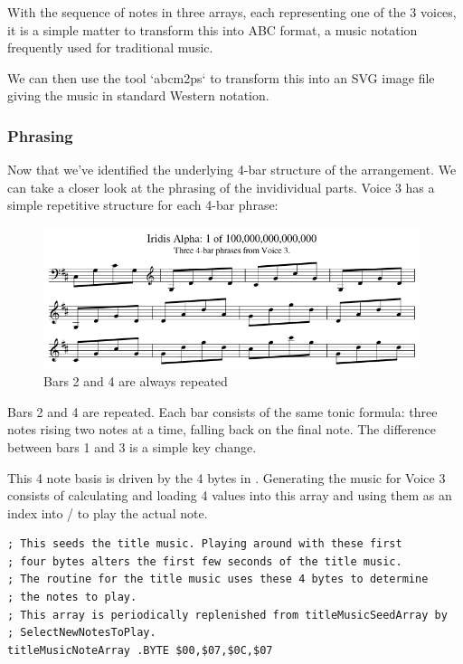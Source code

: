 \begin{tcolorbox}[%
  breakable,
  parbox = false,
  frame hidden,
  sharp corners,
  after skip=10pt,
  overlay broken = {
    \draw[]
      (frame.north west) rectangle (frame.south east);},
]{}
With the sequence of notes in three arrays, each representing one of the 3 voices, it is a simple
matter to transform this into ABC format, a music notation frequently used for traditional music.



We can then use the tool `abcm2ps` to transform this into an SVG image file giving the music in
standard Western notation.

\end{tcolorbox}%

\subsubsection{Phrasing}
Now that we've identified the underlying 4-bar structure of the arrangement. We can take a closer look at the 
phrasing of the invidividual parts. Voice 3 has a simple repetitive structure for each 4-bar phrase:

\begin{figure}[H]
{
  \begin{adjustbox}{width=11cm,center}
  \includegraphics[width=11cm]{music/Voice_3_Phrasing1.png}%
    \end{adjustbox}
}\caption[]{Bars 2 and 4 are always repeated}
\end{figure}

Bars 2 and 4 are repeated. Each bar consists of the same tonic formula: three notes rising two notes at a time,
falling back on the final note. The difference between bars 1 and 3 is a simple key change.

This 4 note basis is driven by the 4 bytes in . Generating the music for Voice 3
consists of calculating and loading 4 values into this array and using them as an index into  
/ to play the actual note.

\begin{lstlisting}
; This seeds the title music. Playing around with these first
; four bytes alters the first few seconds of the title music.
; The routine for the title music uses these 4 bytes to determine
; the notes to play.
; This array is periodically replenished from titleMusicSeedArray by
; SelectNewNotesToPlay.
titleMusicNoteArray .BYTE $00,$07,$0C,$07
\end{lstlisting}


